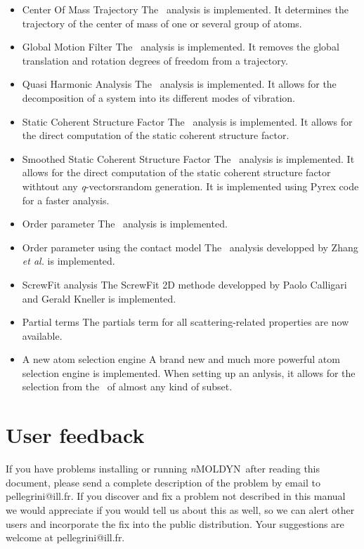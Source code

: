 \documentclass[a4paper,11pt]{report}
\newcommand{\qvects}{\textit{q}-vectors}
\newcommand{\NMOLDYN}{\textit{n}MOLDYN}
\begin{document}
\begin{itemize}
\item{Center Of Mass Trajectory}
The \COMT\ analysis is implemented. It determines the trajectory of the center of mass of one or several group of atoms.

\item{Global Motion Filter}
The \GMFT\ analysis is implemented. It removes the global translation and rotation degrees of freedom from a trajectory.

\item{Quasi Harmonic Analysis}
The \QHA\ analysis is implemented. It allows for the decomposition of a system into its different modes of vibration.

\item{Static Coherent Structure Factor}
The \SCSF\ analysis is implemented. It allows for the direct computation of the static coherent structure factor.

\item{Smoothed Static Coherent Structure Factor}
The \SSCSF\ analysis is implemented. It allows for the direct computation of the static coherent structure factor withtout 
any \qvects random generation. It is implemented using Pyrex code for a faster analysis.

\item{Order parameter}
The \OP\ analysis is implemented.

\item{Order parameter using the contact model}
The \OPCM\ analysis developped by Zhang \textit{et al.} \cite{Bruschweiler} is implemented.

\item{ScrewFit analysis}
The ScrewFit 2D methode developped by Paolo Calligari and Gerald Kneller \cite{Calligari} is implemented.

\item{Partial terms}
The partials term for all scattering-related properties are now available.

\item{A new atom selection engine}
A brand new and much more powerful atom selection engine is implemented. When setting up an anlysis, 
it allows for the selection from the \GUI\ of almost any kind of subset.
\end{itemize}

\section{User feedback}
\label{user_feedback}
If you have problems installing or running \NMOLDYN\ after reading this document, please send a complete description of the problem 
by email to pellegrini@ill.fr. If you discover and fix a problem not described in this manual we would appreciate if you 
would tell us about this as well, so we can alert other users and incorporate the fix into the public distribution.
Your suggestions are welcome at pellegrini@ill.fr.
\end{document}
